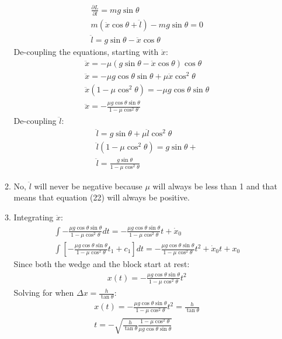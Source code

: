 \documentclass[12pt]{article}
\newcommand{\p}[2]{\frac{\partial #1}{\partial #2}}
\begin{document}
\begin{enumerate}
\begin{enumerate}
\begin{gather}
        \p{L}{l}=mg\sin\theta\\
        m(\ddot{x}\cos\theta+\ddot{l})-mg\sin\theta=0\\
        \ddot{l}=g\sin\theta-\ddot{x}\cos\theta
      \end{gather}
      De-coupling the equations, starting with $\ddot{x}$:
      \begin{gather}
        \ddot{x}=-\mu\left(g\sin\theta-\ddot{x}\cos\theta\right)\cos\theta\\
        \ddot{x}=-\mu g\cos\theta\sin\theta+\mu\ddot{x}\cos^2\theta\\
        \ddot{x}\left( 1-\mu\cos^2\theta \right)=-\mu g\cos\theta\sin\theta\\
        \ddot{x}=-\frac{\mu g\cos\theta\sin\theta}{ 1-\mu\cos^2\theta}
      \end{gather}
      De-coupling $\ddot{l}$:
      \begin{gather}
        \ddot{l}=g\sin\theta+\mu\ddot{l}\cos^2\theta\\
        \ddot{l}\left(1-\mu\cos^2\theta\right)=g\sin\theta+\\
        \ddot{l}=\frac{g\sin\theta}{1-\mu\cos^2\theta}
      \end{gather}
      \item No, $\ddot{l}$ will never be negative because $\mu$ will always be less than 1 and that means that equation (22) will always be positive.
      \item
      Integrating $\ddot{x}$:
      \begin{gather}
        \int-\frac{\mu g\cos\theta\sin\theta}{ 1-\mu\cos^2\theta}dt=-\frac{\mu g\cos\theta\sin\theta}{ 1-\mu\cos^2\theta}t+\dot{x}_0\\
        \int\left[-\frac{\mu g\cos\theta\sin\theta}{ 1-\mu\cos^2\theta}t_1+c_1\right]dt=-\frac{\mu g\cos\theta\sin\theta}{ 1-\mu\cos^2\theta}t^2+\dot{x}_0 t+x_0
      \end{gather}
      Since both the wedge and the block start at rest:
      \begin{gather}
        x(t)=-\frac{\mu g\cos\theta\sin\theta}{ 1-\mu\cos^2\theta}t^2
      \end{gather}
      Solving for when $\Delta x=\frac{h}{\tan\theta}$:
      \begin{gather}
        x(t)=-\frac{\mu g\cos\theta\sin\theta}{ 1-\mu\cos^2\theta}t^2=\frac{h}{\tan\theta}\\
        t=-\sqrt{\frac{h}{\tan\theta}\frac{ 1-\mu\cos^2\theta}{\mu g\cos\theta\sin\theta}}
      \end{gather}

\end{enumerate}
\end{enumerate}
\end{document}
